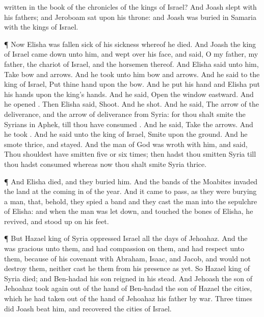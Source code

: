 {written in the
book of the
chronicles of the
kings of
Israel?
And
Joash
slept with his
fathers; and
Jeroboam
sat upon his
throne: and
Joash was
buried in
Samaria with the
kings of
Israel.
\par }{\PP {}¶ Now
Elisha was fallen
sick of his
sickness whereof he
died. And
Joash the
king of
Israel came
down unto him, and
wept over his
face, and
said, O my
father, my
father, the
chariot of
Israel, and the
horsemen thereof.
And
Elisha
said unto him,
Take
bow and
arrows. And he
took unto him
bow and
arrows.
And he
said to the
king of
Israel,
Put thine
hand upon the
bow. And he
put his
hand
{} and
Elisha
put his
hands upon the
king’s
hands.
And he
said,
Open the
window
eastward. And he
opened
{}. Then
Elisha
said,
Shoot. And he
shot. And he
said, The
arrow of the
{}
deliverance, and the
arrow of
deliverance from
Syria: for thou shalt
smite the
Syrians in
Aphek, till thou have
consumed
{}.
And he
said,
Take the
arrows. And he
took
{}. And he
said unto the
king of
Israel,
Smite upon the
ground. And he
smote
thrice, and
stayed.
And the
man of
God was
wroth with him, and
said, Thou shouldest have
smitten
five or
six
times; then hadst thou
smitten
Syria till thou hadst
consumed
{} whereas now thou shalt
smite
Syria
{}
thrice.
\par }{\PP {}¶ And
Elisha
died, and they
buried him. And the
bands of the
Moabites
invaded the
land at the coming
in of the
year.
And it came to pass, as they were
burying a
man, that, behold, they
spied a
band
{} and they
cast the
man into the
sepulchre of
Elisha: and when the
man was let
down, and
touched the
bones of
Elisha, he
revived, and stood
up on his
feet.
\par }{\PP {}¶ But
Hazael
king of
Syria
oppressed
Israel all the
days of
Jehoahaz.
And the
{} was
gracious unto them, and had
compassion on them, and had
respect unto them, because
of his
covenant with
Abraham,
Isaac, and
Jacob, and
would not
destroy them, neither
cast he them from his
presence as
yet.
So
Hazael
king of
Syria
died; and
Ben-hadad his
son
reigned in his stead.
And
Jehoash the
son of
Jehoahaz
took
again out of the
hand of
Ben-hadad the
son of
Hazael the
cities, which he had
taken out of the
hand of
Jehoahaz his
father by
war.
Three
times did
Joash
beat him, and
recovered the
cities of
Israel.

}
